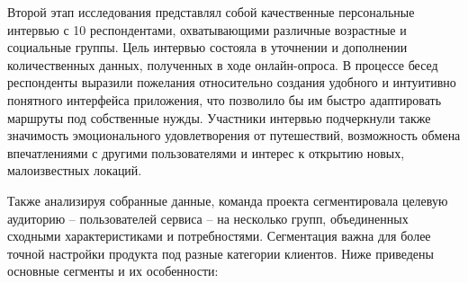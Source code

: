 Второй этап исследования представлял собой качественные персональные интервью с 10 респондентами, охватывающими различные возрастные и социальные группы. Цель интервью состояла в уточнении и дополнении количественных данных, полученных в ходе онлайн-опроса. В процессе бесед респонденты выразили пожелания относительно создания удобного и интуитивно понятного интерфейса приложения, что позволило бы им быстро адаптировать маршруты под собственные нужды. Участники интервью подчеркнули также значимость эмоционального удовлетворения от путешествий, возможность обмена впечатлениями с другими пользователями и интерес к открытию новых, малоизвестных локаций.

Также анализируя собранные данные, команда проекта сегментировала целевую аудиторию – пользователей сервиса – на несколько групп, объединенных сходными характеристиками и потребностями. Сегментация важна для более точной настройки продукта под разные категории клиентов. Ниже приведены основные сегменты и их особенности:
